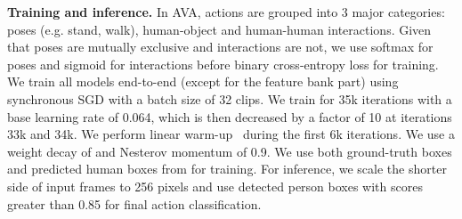 \vspace{-3mm}
\textbf{\flushleft Training and inference.} 
 In AVA, actions are grouped into 3 major categories: poses (e.g. stand, walk), human-object and human-human interactions. Given that poses are mutually exclusive and interactions are not, we use softmax for poses and sigmoid for interactions before binary cross-entropy loss for training.
We train all models end-to-end (except for
the feature bank part) using synchronous SGD with a batch size of 32 clips.
We train for 35k iterations with a base learning rate of 0.064, which is then decreased by a factor of 10 at iterations 33k and 34k. 
We perform linear warm-up~\cite{goyal2017accurate} during the first 6k iterations. We use a weight decay of  and Nesterov momentum of 0.9. 
We use both ground-truth boxes and predicted human boxes from \cite{wu2019long} for training. 
For inference, we scale the shorter side of input frames to 256 pixels and use detected person boxes with scores greater than 0.85 for final action classification.


